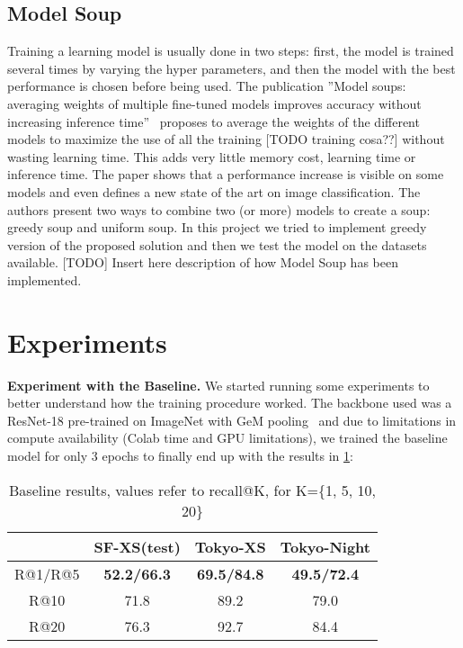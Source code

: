 \documentclass[10pt,twocolumn,letterpaper]{article}
\begin{document}
\subsection{Model Soup}
Training a learning model is usually done in two steps: first, the model is trained several times by varying the hyper parameters, and then the model with the best performance is chosen before being used. 
The publication ”Model soups: averaging weights of multiple fine-tuned models improves accuracy without increasing inference time”~\cite{modelsoup} proposes to average the weights of the different models to maximize the use of all the training [TODO training cosa??] without wasting learning time. This adds very little memory cost, learning time or inference time. The paper shows that a performance increase is visible on some models and even defines a new state of the art on image classification. The authors present two ways to combine two (or more) models to create a soup: greedy soup and uniform soup. In this project we tried to implement greedy version of the proposed solution and then we test the model on the datasets available.
[TODO] Insert here description of how Model Soup has been implemented.

\section{Experiments}
\textbf{Experiment with the Baseline.}
We started running some experiments to better understand how the training procedure worked. The backbone used was a ResNet-18 pre-trained on ImageNet with GeM pooling~\cite{finetuning} and due to limitations in compute availability (\eg Colab time and GPU limitations), we trained the baseline model for only 3 epochs to finally end up with the results in \cref{tab:baseline}:


\begin{table}[htp]
  \centering
  \begin{tabular}{@{}cccc@{}}
    \toprule
    & SF-XS(test) & Tokyo-XS & Tokyo-Night\\
    \midrule
    R@1/R@5 & \textbf{52.2/66.3} & \textbf{69.5/84.8} & \textbf{49.5/72.4} \\
    R@10 & 71.8 & 89.2 & 79.0\\
    R@20 & 76.3 & 92.7 & 84.4\\
    \bottomrule
  \end{tabular}
  \caption{Baseline results, values refer to recall@K, for K=\{1, 5, 10, 20\}}
  \label{tab:baseline}
\end{table}
\end{document}
